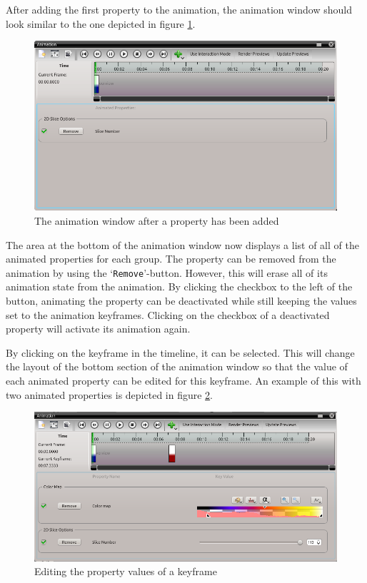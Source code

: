 After adding the first property to the animation, the animation window should look similar to the one depicted in figure \ref{fig:animation_keyframe}.

\begin{figure}[!htb]
 \centering
 \includegraphics[scale=0.5,keepaspectratio=true]{./images/animation_keyframe.png}
 \caption{The animation window after a property has been added}
 \label{fig:animation_keyframe}
\end{figure}

The area at the bottom of the animation window now displays a list of all of the animated properties for each group. The property can be removed from the animation by using the 
`\verb|Remove|'-button. However, this will erase all of its animation state from the animation. By clicking the checkbox to the left of the button, animating the property
can be deactivated while still keeping the values set to the animation keyframes. Clicking on the checkbox of a deactivated property will activate its animation again.

By clicking on the keyframe in the timeline, it can be selected. This will change the layout of the bottom section of the animation window so that the value of each  
animated property can be edited for this keyframe. An example of this with two animated properties is depicted in figure \ref{fig:animation_keyframe_editing}.

\begin{figure}[htb]
 \centering
 \includegraphics[scale=0.5,keepaspectratio=true]{./images/animation_keyframe_editing.png}
 \caption{Editing the property values of a keyframe}
 \label{fig:animation_keyframe_editing}
\end{figure}

